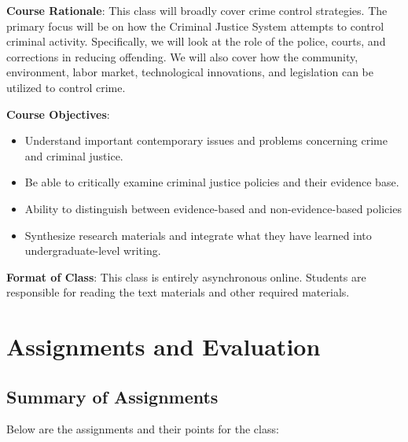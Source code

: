 \documentclass[11pt,]{article}
\begin{document}
\textbf{Course Rationale}: This class will broadly cover crime control
strategies. The primary focus will be on how the Criminal Justice System
attempts to control criminal activity. Specifically, we will look at the
role of the police, courts, and corrections in reducing offending. We
will also cover how the community, environment, labor market,
technological innovations, and legislation can be utilized to control
crime.

\textbf{Course Objectives}:

\begin{itemize}
\item
  Understand important contemporary issues and problems concerning crime
  and criminal justice.
\item
  Be able to critically examine criminal justice policies and their
  evidence base.
\item
  Ability to distinguish between evidence-based and non-evidence-based
  policies
\item
  Synthesize research materials and integrate what they have learned
  into undergraduate-level writing.
\end{itemize}

\textbf{Format of Class}: This class is entirely asynchronous online.
Students are responsible for reading the text materials and other
required materials.

\section{Assignments and Evaluation}\label{assignments-and-evaluation}

\subsection{Summary of Assignments}\label{summary-of-assignments}

Below are the assignments and their points for the class:

\begin{table}[!h]
\centering
{}
\end{table}
\end{document}
